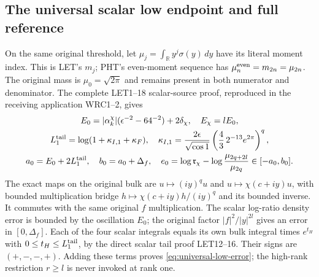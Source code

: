 \documentclass[11pt,a4paper]{article}
\newcommand{\R}{\mathbb R}
\begin{document}
\subsection{The universal scalar low endpoint and full reference}
On the same original threshold, let $\mu_j=\int_{\R}y^j\sigma(y)\,dy$
have its literal moment index. This is LET's $m_j$; PHT's
even-moment sequence has $\mu_n^{\rm even}=m_{2n}=\mu_{2n}$.
The original mass is $\mu_0=\sqrt{2\pi}$ and remains present
in both numerator and denominator. The complete LET1--18
scalar-source proof, reproduced in the receiving application
WRC1--2, gives
\begin{equation}
\begin{gathered}
 E_0=|\alpha_k^\chi|(\epsilon^{-2}-64^{-2})+2\delta_\chi,
 \quad E_\chi=lE_0,\\
 L_1^{\rm tail}=\log(1+\kappa_{I,1}+\kappa_F),\quad
 \kappa_{I,1}=\frac{2\epsilon}{\sqrt{\cos1}}
       \left(\frac43\,2^{-13}e^{2\pi}\right)^q,\\
 a_0=E_0+2L_1^{\rm tail},\quad b_0=a_0+\Delta_f,\quad
 e_0=\log\mathfrak r_\chi-
       \log\frac{\mu_{2q+2l}}{\mu_{2q}}\in[-a_0,b_0].
\end{gathered}\label{eq:universal-low-error}
\end{equation}
The exact maps on the original bulk are $u\mapsto(iy)^q u$
and $u\mapsto\chi(c+iy)u$, with bounded multiplication bridge
$h\mapsto\chi(c+iy)h/(iy)^q$ and its bounded inverse.
It commutes with the same original $f$ multiplication.
The scalar log-ratio density error is bounded by the oscillation
$E_0$; the original factor $|f|^2/|y|^{2l}$ gives an error
in $[0,\Delta_f]$. Each of the four scalar integrals equals
its own bulk integral times $e^{t_H}$ with
$0\leq t_H\leq L_1^{\rm tail}$, by the direct scalar tail
proof LET12--16. Their signs are $(+,-,-,+)$.
Adding these terms proves \eqref{eq:universal-low-error};
the high-rank restriction $r\geq l$ is never invoked at rank one.
\end{document}
